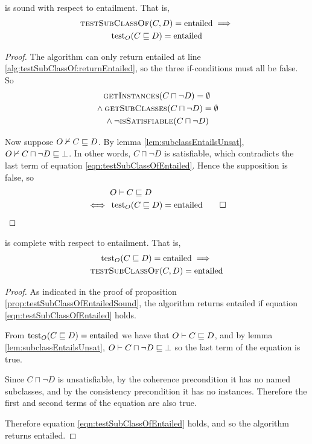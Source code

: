\documentclass[paper.tex]{subfiles}
\begin{document}
\begin{proposition}
  \label{prop:testSubClassOfEntailedSound}
   is sound with respect to entailment.  That is,
  \begin{multline*}
    \Call{testSubClassOf}{C, D} = \entailed \implies \\
    \test_O(C \sqsubseteq D) = \entailed
  \end{multline*}
\end{proposition}
\begin{proof}
  The algorithm can only return entailed at line \ref{alg:testSubClassOf:returnEntailed}, so the three if-conditions must all be false.  So
  \begin{multline}
    \label{eqn:testSubClassOfEntailed}
    \Call{getInstances}{C \sqcap \neg D} = \emptyset \\
    {} \land \Call{getSubClasses}{C \sqcap \neg D} = \emptyset \\
    {} \land \lnot \Call{isSatisfiable}{C \sqcap \neg D}
  \end{multline}

  Now suppose $O \nvdash C \sqsubseteq D$.  By lemma \ref{lem:subclassEntailsUnsat}, $O \nvdash C \sqcap \neg D \sqsubseteq \bot$.  In other words, $C \sqcap \neg D$ is satisfiable, which contradicts the last term of equation \ref{eqn:testSubClassOfEntailed}.  Hence the supposition is false, so
  \begin{align*}
    & O \vdash C \sqsubseteq D \\
    \iff{}& \operatorname{test}_O(C \sqsubseteq D) = \mathrm{entailed}
    \qed
  \end{align*}
\end{proof}

\begin{proposition}
  \label{prop:testSubClassOfEntailedComplete}
   is complete with respect to entailment.  That is,
  \begin{multline*}
    \test_O(C \sqsubseteq D) = \entailed \implies \\
    \Call{testSubClassOf}{C, D} = \entailed
  \end{multline*}
\end{proposition}
\begin{proof}
  As indicated in the proof of proposition \ref{prop:testSubClassOfEntailedSound}, the algorithm returns entailed if equation \ref{eqn:testSubClassOfEntailed} holds.

  From $\operatorname{test}_O(C \sqsubseteq D) = \mathrm{entailed}$ we have that $O \vdash C \sqsubseteq D$, and by lemma \ref{lem:subclassEntailsUnsat}, $O \vdash C \sqcap \neg D \sqsubseteq \bot$ so the last term of the equation is true.

  Since $C \sqcap \neg D$ is unsatisfiable, by the coherence precondition it has no named subclasses, and by the consistency precondition it has no instances.  Therefore the first and second terms of the equation are also true.

  Therefore equation \ref{eqn:testSubClassOfEntailed} holds, and so the algorithm returns entailed.
\end{proof}
\end{document}
